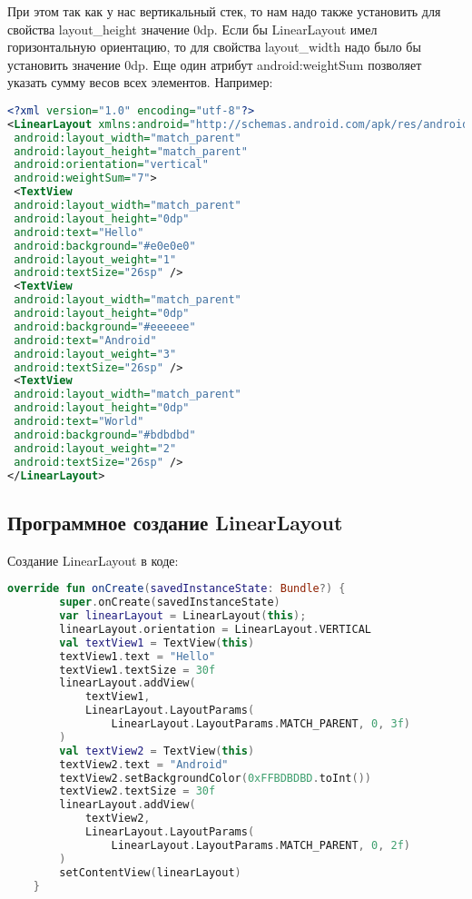 При этом так как у нас вертикальный стек, то нам надо также установить для
свойства layout\_height значение 0dp.
Если бы LinearLayout имел
горизонтальную ориентацию, то для свойства layout\_width надо было бы
установить значение 0dp.
Еще один атрибут android:weightSum позволяет указать сумму весов всех
элементов.
Например:
\begin{lstlisting}[language=xml, caption=\leftline{xml}, label=lst:android:weightSum]
<?xml version="1.0" encoding="utf-8"?>
<LinearLayout xmlns:android="http://schemas.android.com/apk/res/android"
 android:layout_width="match_parent"
 android:layout_height="match_parent"
 android:orientation="vertical"
 android:weightSum="7">
 <TextView
 android:layout_width="match_parent"
 android:layout_height="0dp"
 android:text="Hello"
 android:background="#e0e0e0"
 android:layout_weight="1"
 android:textSize="26sp" />
 <TextView
 android:layout_width="match_parent"
 android:layout_height="0dp"
 android:background="#eeeeee"
 android:text="Android"
 android:layout_weight="3"
 android:textSize="26sp" />
 <TextView
 android:layout_width="match_parent"
 android:layout_height="0dp"
 android:text="World"
 android:background="#bdbdbd"
 android:layout_weight="2"
 android:textSize="26sp" />
</LinearLayout>
\end{lstlisting}

\subsection{Программное создание LinearLayout}
Создание LinearLayout в коде:
\begin{lstlisting}[language=Kotlin, caption=\leftline{Kotlin}, label=lst:Программное создание LinearLayout]
override fun onCreate(savedInstanceState: Bundle?) {
        super.onCreate(savedInstanceState)
        var linearLayout = LinearLayout(this);
        linearLayout.orientation = LinearLayout.VERTICAL
        val textView1 = TextView(this)
        textView1.text = "Hello"
        textView1.textSize = 30f
        linearLayout.addView(
            textView1,
            LinearLayout.LayoutParams(
                LinearLayout.LayoutParams.MATCH_PARENT, 0, 3f)
        )
        val textView2 = TextView(this)
        textView2.text = "Android"
        textView2.setBackgroundColor(0xFFBDBDBD.toInt())
        textView2.textSize = 30f
        linearLayout.addView(
            textView2,
            LinearLayout.LayoutParams(
                LinearLayout.LayoutParams.MATCH_PARENT, 0, 2f)
        )
        setContentView(linearLayout)
    }
\end{lstlisting}

